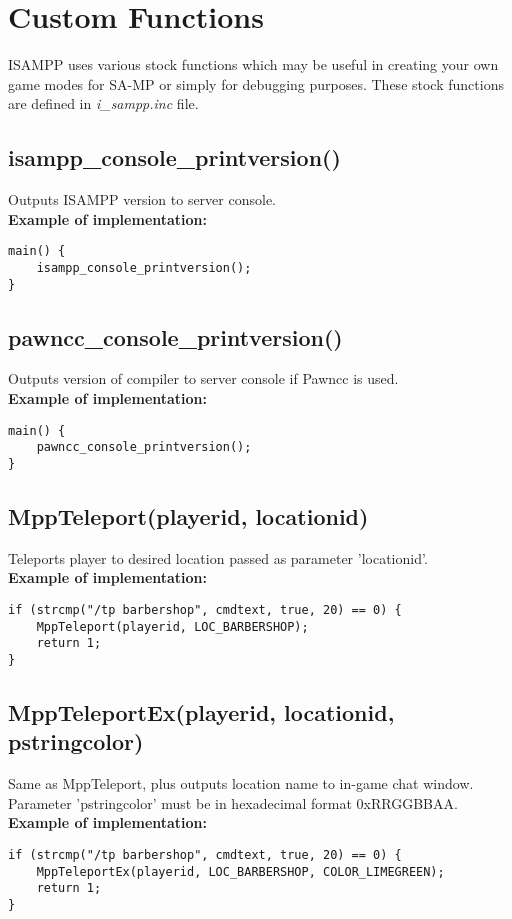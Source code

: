 \documentclass{article}
\begin{document}
\newpage
\section{Custom Functions}
ISAMPP uses various stock functions which may be useful in creating your own game modes for SA-MP or simply for debugging purposes. These stock functions are defined in \textit{i\_sampp.inc} file.


\subsection{isampp\_console\_printversion()}
Outputs ISAMPP version to server console.
\bigskip
\\\textbf{Example of implementation:}
\begin{verbatim}
main() {
    isampp_console_printversion();
}
\end{verbatim}


\subsection{pawncc\_console\_printversion()}
Outputs version of compiler to server console if Pawncc is used.
\bigskip
\\\textbf{Example of implementation:}
\begin{verbatim}
main() {
    pawncc_console_printversion();
}
\end{verbatim}


\subsection{MppTeleport(playerid, locationid)}
Teleports player to desired location passed as parameter 'locationid'.
\bigskip
\\\textbf{Example of implementation:}
\begin{verbatim}
if (strcmp("/tp barbershop", cmdtext, true, 20) == 0) {
    MppTeleport(playerid, LOC_BARBERSHOP);
    return 1;
}
\end{verbatim}


\subsection{MppTeleportEx(playerid, locationid, pstringcolor)}
Same as MppTeleport, plus outputs location name to in-game chat window. \\Parameter 'pstringcolor' must be in hexadecimal format 0xRRGGBBAA.
\bigskip
\\\textbf{Example of implementation:}
\begin{verbatim}
if (strcmp("/tp barbershop", cmdtext, true, 20) == 0) {
    MppTeleportEx(playerid, LOC_BARBERSHOP, COLOR_LIMEGREEN);
    return 1;
}
\end{verbatim}
\end{document}
